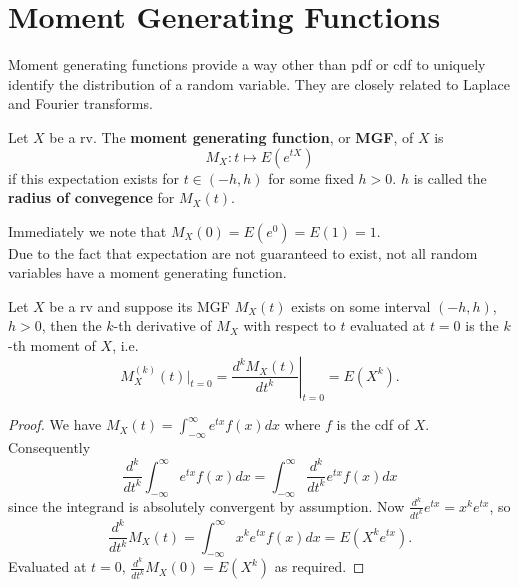 \documentclass[11pt,fleqn]{book} %
\begin{document}

\section{Moment Generating Functions}

\begin{remark} Moment generating functions provide a way other than pdf or cdf to uniquely identify the distribution of a random variable. They are closely related to Laplace and Fourier transforms.
\end{remark}

\begin{definition} \label{def:192}
Let \(X\) be a rv. The \textbf{moment generating function}, or \textbf{MGF}, of \(X\) is
\[
M_X: t \mapsto E(e^{tX})
\]
if this expectation exists for \(t \in (-h, h)\) for some fixed \(h > 0\). \(h\) is called the \textbf{radius of convegence} for \(M_X(t)\).
\end{definition}

\begin{remark} \label{rmk:193}
Immediately we note that \(M_X(0) = E(e^0) = E(1) = 1\).\\
\indent Due to the fact that expectation are not guaranteed to exist, not all random variables have a moment generating function.
\end{remark}

\begin{proposition} \label{prop:194}
Let \(X\) be a rv and suppose its MGF \(M_X(t)\) exists on some interval \((-h, h)\), \(h > 0\), then the \(k\)-th derivative of \(M_X\) with respect to \(t\) evaluated at \(t = 0\) is the \(k\)-th moment of \(X\), i.e.
\[
M_X^{(k)}(t)|_{t=0} = \left.\frac{d^kM_X(t)}{dt^k}\right|_{t=0} = E(X^k).
\]
\end{proposition}
\begin{proof} We have \(M_X(t) = \int_{-\infty}^\infty e^{tx}f(x)dx\) where \(f\) is the cdf of \(X\). Consequently
\[
\frac{d^k}{dt^k}\int_{-\infty}^\infty e^{tx}f(x)dx = \int_{-\infty}^\infty \frac{d^k}{dt^k} e^{tx}f(x)dx
\]
since the integrand is absolutely convergent by assumption. Now \(\frac{d^k}{dt^k} e^{tx} = x^k e^{tx}\), so
\[
\frac{d^k}{dt^k}M_X(t) = \int_{-\infty}^\infty x^k e^{tx}f(x)dx = E(X^k e^{tx}).
\]
\indent Evaluated at \(t = 0\), \(\frac{d^k}{dt^k}M_X(0) = E(X^k)\) as required.
\end{proof}
\end{document}
